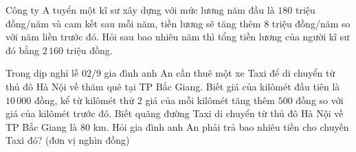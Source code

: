 \begin{ex}%
	Công ty A tuyển một kĩ sư xây dựng với mức lương năm đầu là $180$ triệu đồng/năm và cam  kết sau mỗi năm, tiền lương sẽ tăng thêm $8$ triệu đồng/năm so với năm liền trước đó. Hỏi sau bao nhiêu năm thì tổng tiền lương của người kĩ sư đó bằng $2\,160$ triệu đồng.
\end{ex}

\begin{ex}%
	Trong dịp nghỉ lễ $02/9$ gia đình anh An cần thuê một xe Taxi để di chuyển từ thủ đô Hà Nội về thăm quê tại TP Bắc Giang. Biết giá của kilômét đầu tiên là $10\,000$ đồng, kể từ kilômét thứ $2$ giá của mỗi kilômét tăng thêm $500$ đồng so với giá của kilômét trước đó. Biết quãng đường Taxi di chuyển từ thủ đô Hà Nội về TP Bắc Giang là $80$ km. Hỏi  gia đình anh An phải trả bao nhiêu tiền cho chuyến Taxi đó? (đơn vị nghìn đồng)
\end{ex}

